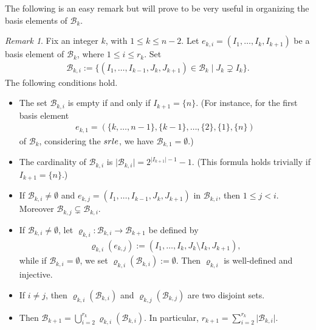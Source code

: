 \documentclass[10pt]{amsart}
\newcommand{\mcb}{\mbox{$\mathcal{B}$}}
\newcommand{\srle}{\mbox{${\rm srle}$}}
\theoremstyle{definition}
\theoremstyle{remark}
\newtheorem{remark}[cdrthm]{Remark}
\begin{document}
The following is an easy remark but will prove to be very useful in
organizing the basis elements of $\mcb_k$.

\begin{remark}\label{bki}
Fix an integer $k$, with $1\leq k\leq n-2$. Let $e_{k,i}=(I_1,\ldots
,I_k,I_{k+1})$ be a basis element of $\mcb_k$, where $1\leq i\leq
r_{k}$. Set
\begin{eqnarray*}
\mcb_{k,i}:=\{(I_1,\ldots ,I_{k-1},J_k,J_{k+1})\in\mcb_k\mid
J_k\supsetneq I_k\}.
\end{eqnarray*}
The following conditions hold.
\begin{itemize}
\item[$(a)$] The set $\mcb_{k,i}$ is empty if and only if
  $I_{k+1}=\{n\}$. (For instance, for the first basis element
\begin{eqnarray*}  
e_{k,1}=(\{k,\ldots ,n-1\},\{k-1\},\ldots ,\{2\},\{1\},\{n\})
\end{eqnarray*} 
of $\mcb_k$, considering the $\srle$, we have $\mcb_{k,1}=\emptyset$.)
\item[$(b)$] The cardinality of $\mcb_{k,i}$ is $\lvert
  \mcb_{k,i}\rvert=2^{\lvert I_{k+1}\rvert -1}-1$. (This formula holds
  trivially if $I_{k+1}=\{n\}$.)
\item[$(c)$] If $\mcb_{k,i}\neq \emptyset$ and $e_{k,j}=(I_1,\ldots
  ,I_{k-1},J_k,J_{k+1})$ in $\mcb_{k,i}$, then $1\leq j<i$. Moreover
  $\mcb_{k,j}\subsetneq\mcb_{k,i}$.
\item[$(d)$] If $\mcb_{k,i}\neq \emptyset$, let
  $\varrho_{k,i}:\mcb_{k,i}\to\mcb_{k+1}$ be defined by
\begin{eqnarray*}
\varrho_{k,i}(e_{k,j}):=(I_1,\ldots ,I_k,J_k\setminus I_k,J_{k+1}),
\end{eqnarray*}
while if $\mcb_{k,i}=\emptyset$, we set $\varrho_{k,i}(\mcb_{k,i}):=\emptyset$.
Then $\varrho_{k,i}$ is well-defined and injective.
\item[$(e)$] If $i\neq j$, then $\varrho_{k,i}(\mcb_{k,i})$ and
  $\varrho_{k,j}(\mcb_{k,j})$ are two disjoint sets.
\item[$(f)$] Then $\mcb_{k+1}=\bigcup_{i=2}^{r_k}\varrho_{k,i}(\mcb_{k,i})$.
In particular, $r_{k+1}=\sum_{i=2}^{r_k}\lvert\mcb_{k,i}\rvert$.
\end{itemize}
\end{remark}
\end{document}
